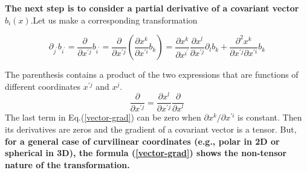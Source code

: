 \textbf{The next step is to consider a partial derivative of a covariant vector $b_i(x)$}.Let us make a corresponding transformation
\begin{qt}
\begin{equation}
\partial_{j^{\prime}} b_{i^{\prime}}=\frac{\partial}{\partial x^{\prime j}} b_{i^{\prime}}=\frac{\partial}{\partial x^{\prime j}}\left(\frac{\partial x^{k}}{\partial x^{\prime i}} b_{k}\right)=\frac{\partial x^{k}}{\partial x^{i^{\prime}}} \frac{\partial x^{l}}{\partial x^{\prime j}} \partial_{l} b_{k}+\frac{\partial^{2} x^{k}}{\partial x^{\prime j} \partial x^{\prime i}} b_{k}
\label{vector-grad}
\end{equation}
\end{qt}
The parenthesis contains a product of the two expressions that are functions of different coordinates $x^{\prime j}$ and $x^j$. 
\begin{equation}
\frac{\partial}{\partial x^{\prime j}}=\frac{\partial x^{l}}{\partial x^{\prime j}} \frac{\partial}{\partial x^{l}}
\label{chain-rule}
\end{equation}
The last term in Eq.(\ref{vector-grad}) can be zero when $\partial x^{k} / \partial x^{\prime i}$ is constant. Then its derivatives are zeros and the gradient of a covariant vector is a tensor. But, \textbf{for a general case of curvilinear coordinates (e.g., polar in 2D or spherical
in 3D), the formula (\ref{vector-grad}) shows the non-tensor nature of the transformation.}

